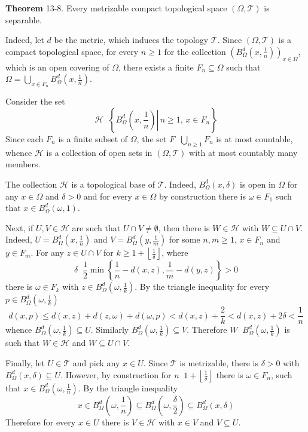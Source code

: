 \documentclass[a4paper]{article}
\newcommand{\obj}[1]{\left\{ #1 \right \}}
\newcommand{\brac}[1]{\left ( #1 \right )}
\newcommand{\induc}[1]{\left . #1 \right \vert}
\newcommand{\floor}[1]{\left\lfloor #1 \right\rfloor}
\newcommand{\Tcal}{\mathcal{T}}
\newcommand{\Hcal}{\mathcal{H}}
\newcommand{\defn}{\mathop{\overset{\Delta}{=}}\nolimits}
\begin{document}
\label{thm:metr_compact_separable} \noindent \textbf{Theorem} 13-8.
Every metrizable compact topological space $\brac{\Omega, \Tcal}$ is separable.

Indeed, let $d$ be the metric, which induces the topology $\Tcal$. Since $\brac{\Omega,\Tcal}$ is a compact topological space, for every $n\geq1$ for the collection $\brac{B^d_\Omega\brac{x,\frac{1}{n}}}_{x\in \Omega}$, which is an open covering of $\Omega$, there exists a finite $F_n\subseteq \Omega$ such that $\Omega = \bigcup_{x\in F_n} B^d_\Omega\brac{x,\frac{1}{n}}$.

Consider the set \[\Hcal\defn \obj{\induc{B^d_\Omega\brac{x,\frac{1}{n}}}\, n\geq1,\,x\in F_n}\] Since each $F_n$ is a finite subset of $\Omega$, the set $F\defn \bigcup_{n\geq1} F_n$ is at most countable, whence $\Hcal$ is a collection of open sets in $\brac{\Omega,\Tcal}$ with at most countably many members.

The collection $\Hcal$ is a topological base of $\Tcal$. Indeed, $B^d_\Omega\brac{x,\delta}$ is open in $\Omega$ for any $x\in \Omega$ and $\delta>0$ and for every $x\in \Omega$ by construction there is $\omega\in F_1$ such that $x\in B^d_\Omega\brac{\omega,1}$.

Next, if $U,V\in \Hcal$ are such that $U\cap V\neq \emptyset$, then there is $W\in \Hcal$ with $W\subseteq U\cap V$. Indeed, $U=B^d_\Omega\brac{x,\frac{1}{n}}$ and $V=B^d_\Omega\brac{y,\frac{1}{m}}$ for some $n,m\geq1$, $x\in F_n$ and $y\in F_m$. For any $z\in U\cap V$ for $k\geq1+\floor{\frac{1}{\delta}}$, where \[\delta\defn \frac{1}{2}\min\obj{ \frac{1}{n}-d\brac{x,z}, \frac{1}{m}-d\brac{y,z} }>0\] there is $\omega\in F_k$ with $z\in B^d_\Omega\brac{\omega, \frac{1}{k}}$. By the triangle inequality for every $p\in B^d_\Omega\brac{\omega, \frac{1}{k}}$ \[d\brac{x,p}\leq d\brac{x,z}+d\brac{z,\omega}+d\brac{\omega,p} < d\brac{x,z} + \frac{2}{k} < d\brac{x,z} + 2\delta < \frac{1}{n}\] whence $B^d_\Omega\brac{\omega, \frac{1}{k}}\subseteq U$. Similarly $B^d_\Omega\brac{\omega, \frac{1}{k}}\subseteq V$. Therefore $W\defn B^d_\Omega\brac{\omega, \frac{1}{k}}$ is such that $W\in \Hcal$ and $W\subseteq U\cap V$.

Finally, let $U\in \Tcal$ and pick any $x\in U$. Since $\Tcal$ is metrizable, there is $\delta>0$ with $B^d_\Omega\brac{x,\delta}\subseteq U$. However, by construction for $n\defn1+\floor{\frac{1}{\delta}}$ there is $\omega\in F_n$, such that $x\in B^d_\Omega\brac{\omega,\frac{1}{n}}$. By the triangle inequality \[x\in B^d_\Omega\brac{\omega,\frac{1}{n}}\subseteq B^d_\Omega\brac{\omega,\frac{\delta}{2}} \subseteq B^d_\Omega\brac{x,\delta}\] Therefore for every $x\in U$ there is $V\in \Hcal$ with $x\in V$ and $V\subseteq U$.
\end{document}
